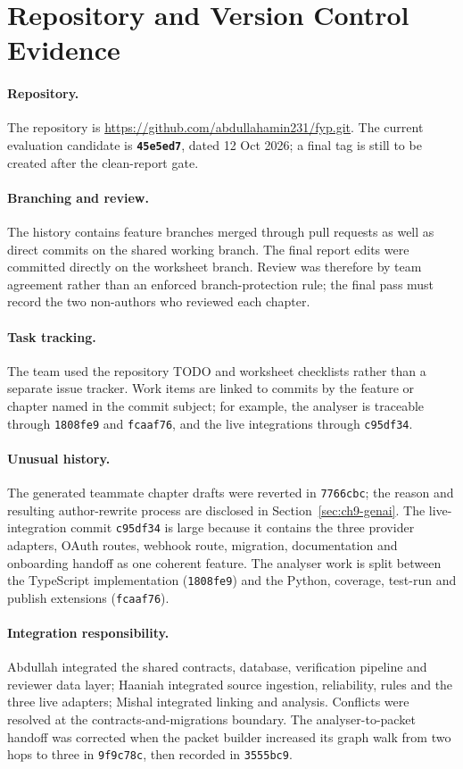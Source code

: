 \section{Repository and Version Control Evidence}

\paragraph{Repository.} The repository is
\url{https://github.com/abdullahamin231/fyp.git}. The current evaluation
candidate is \textbf{\texttt{45e5ed7}}, dated 12 Oct 2026; a final tag is
still to be created after the clean-report gate.

\paragraph{Branching and review.} The history contains feature branches merged
through pull requests as well as direct commits on the shared working branch.
The final report edits were committed directly on the worksheet branch.
Review was therefore by team agreement rather than an enforced
branch-protection rule; the final pass must record the two non-authors who
reviewed each chapter.

\paragraph{Task tracking.} The team used the repository TODO and worksheet
checklists rather than a separate issue tracker. Work items are linked to
commits by the feature or chapter named in the commit subject; for example,
the analyser is traceable through \texttt{1808fe9} and \texttt{fcaaf76}, and
the live integrations through \texttt{c95df34}.

\paragraph{Unusual history.} The generated teammate chapter drafts were
reverted in \texttt{7766cbc}; the reason and resulting author-rewrite process
are disclosed in Section~\ref{sec:ch9-genai}. The live-integration commit
\texttt{c95df34} is large because it contains the three provider adapters,
OAuth routes, webhook route, migration, documentation and onboarding handoff
as one coherent feature. The analyser work is split between the TypeScript
implementation (\texttt{1808fe9}) and the Python, coverage, test-run and
publish extensions (\texttt{fcaaf76}).

\paragraph{Integration responsibility.} Abdullah integrated the shared
contracts, database, verification pipeline and reviewer data layer; Haaniah
integrated source ingestion, reliability, rules and the three live adapters;
Mishal integrated linking and analysis. Conflicts were resolved at the
contracts-and-migrations boundary. The analyser-to-packet handoff was corrected
when the packet builder increased its graph walk from two hops to three in
\texttt{9f9c78c}, then recorded in \texttt{3555bc9}.

